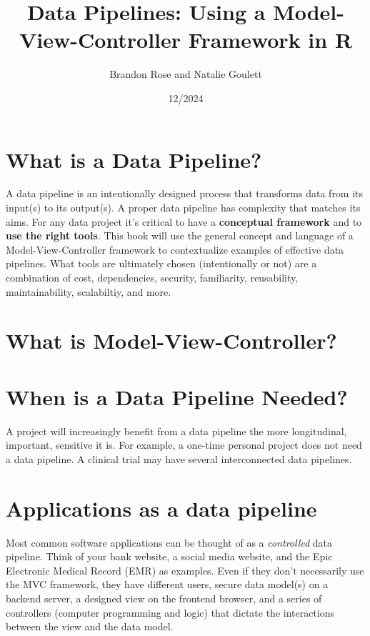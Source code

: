 \documentclass[
]{book}
\title{Data Pipelines: Using a Model-View-Controller Framework in R}
\author{Brandon Rose and Natalie Goulett}
\date{12/2024}
\begin{document}
\maketitle

{
\setcounter{tocdepth}{1}
\tableofcontents
}
\chapter{What is a Data Pipeline?}\label{what-is-a-data-pipeline}

A data pipeline is an intentionally designed process that transforms data from its input(s) to its output(s). A proper data pipeline has complexity that matches its aims. For any data project it's critical to have a \textbf{conceptual framework} and to \textbf{use the right tools}. This book will use the general concept and language of a Model-View-Controller framework to contextualize examples of effective data pipelines. What tools are ultimately chosen (intentionally or not) are a combination of cost, dependencies, security, familiarity, reusability, maintainability, scalabiltiy, and more.

\chapter{What is Model-View-Controller?}\label{what-is-model-view-controller}

\chapter{When is a Data Pipeline Needed?}\label{when-is-a-data-pipeline-needed}

A project will increasingly benefit from a data pipeline the more longitudinal, important, sensitive it is. For example, a one-time personal project does not need a data pipeline. A clinical trial may have several interconnected data pipelines.

\chapter{Applications as a data pipeline}\label{applications-as-a-data-pipeline}

Most common software applications can be thought of as a \emph{controlled} data pipeline. Think of your bank website, a social media website, and the Epic Electronic Medical Record (EMR) as examples. Even if they don't necessarily use the MVC framework, they have different users, secure data model(s) on a backend server, a designed view on the frontend browser, and a series of controllers (computer programming and logic) that dictate the interactions between the view and the data model.
\end{document}
